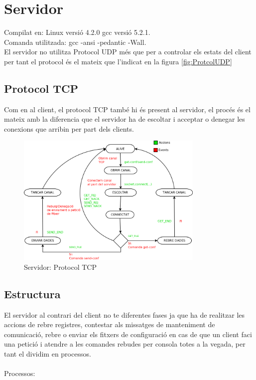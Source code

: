 \documentclass[11pt]{article}
\begin{document}
\section{Servidor}
Compilat en: Linux versió 4.2.0 gcc versió 5.2.1.\\
Comanda utilitzada: gcc -ansi -pedantic -Wall.\\
El servidor no utilitza Protocol UDP més que per a controlar els estats del client per tant el protocol és el mateix que l'indicat en la figura \ref{fig:ProtcolUDP}
\subsection{Protocol TCP}
Com en al client, el protocol TCP també hi és present al servidor, el procés és el mateix amb la diferencia que el servidor ha de escoltar i acceptar o denegar les conexions que arribin per part dels clients.
\begin{figure}[h]
    \centering
    \includegraphics[width=0.8\textwidth]{ServidorTCP.png}
    \caption{Servidor: Protocol TCP}
    \label{fig:PrtocolTCPserv}
\end{figure}
\newpage

\subsection{Estructura}
El servidor al contrari del client no te diferentes fases ja que ha de realitzar les accions de rebre registres, contestar als missatges de manteniment de comunicació, rebre o enviar els fitxers de configuració en cas de que un client faci una petició i atendre a les comandes rebudes per consola totes a la vegada, per tant el dividim en processos.\\\\
Processos:
\end{document}
